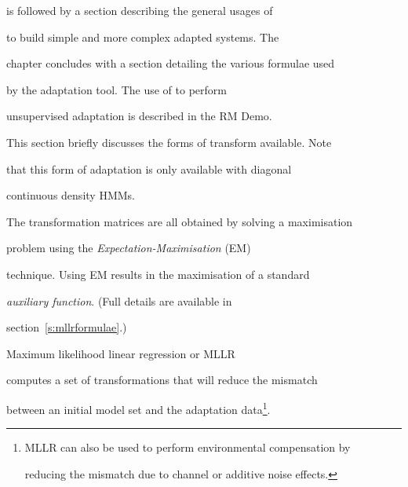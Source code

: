 is followed by a section describing the general usages of


 to build simple and more complex adapted systems. The


chapter concludes with a section detailing the various formulae used


by the adaptation tool.  The use of  to perform


unsupervised adaptation is described in the RM Demo. 















This section briefly discusses the forms of transform available. Note


that this form of adaptation is only available with diagonal


continuous density HMMs.





The transformation matrices are all obtained by solving a maximisation


problem using the \textit{Expectation-Maximisation} (EM)


technique. Using EM results in the maximisation of a standard


\textit{auxiliary function}. (Full details are available in


section~\ref{s:mllrformulae}.)










Maximum likelihood linear regression or MLLR


computes a set of transformations that will reduce the mismatch


between an initial model set and the adaptation data\footnote{


MLLR can also be used to perform environmental compensation by


reducing the mismatch due to channel or additive noise effects.}.


